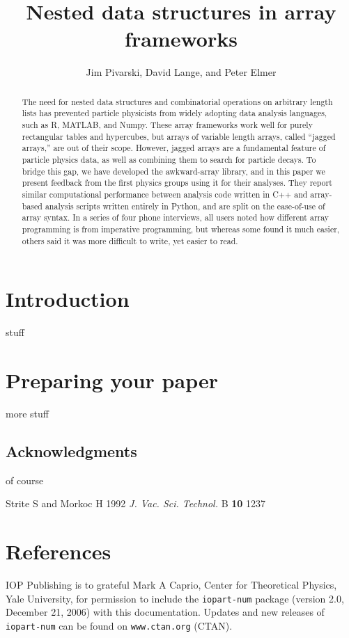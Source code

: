 \documentclass[a4paper]{jpconf}
\begin{document}
\title{Nested data structures in array frameworks}

\author{Jim Pivarski, David Lange, and Peter Elmer}

\address{Princeton University}


\begin{abstract}
The need for nested data structures and combinatorial operations on arbitrary length lists has prevented particle physicists from widely adopting data analysis languages, such as R, MATLAB, and Numpy. These array frameworks work well for purely rectangular tables and hypercubes, but arrays of variable length arrays, called ``jagged arrays,'' are out of their scope. However, jagged arrays are a fundamental feature of particle physics data, as well as combining them to search for particle decays. To bridge this gap, we have developed the awkward-array library, and in this paper we present feedback from the first physics groups using it for their analyses. They report similar computational performance between analysis code written in C++ and array-based analysis scripts written entirely in Python, and are split on the ease-of-use of array syntax. In a series of four phone interviews, all users noted how different array programming is from imperative programming, but whereas some found it much easier, others said it was more difficult to write, yet easier to read.
\end{abstract}

\section{Introduction}

stuff

\section{Preparing your paper}

more stuff

\subsection{Acknowledgments}

of course

\medskip
\begin{thebibliography}{9}
\item Strite S and Morkoc H 1992 {\it J. Vac. Sci. Technol.} B {\bf 10} 1237 
\end{thebibliography}
\smallskip

\section*{References}
\begin{thebibliography}{9}
 IOP Publishing is to grateful Mark A Caprio, Center for Theoretical Physics, Yale University, for permission to include the {\tt iopart-num} \BibTeX package (version 2.0, December 21, 2006) with  this documentation. Updates and new releases of {\tt iopart-num} can be found on \verb"www.ctan.org" (CTAN). 
\end{thebibliography}
\end{document}
